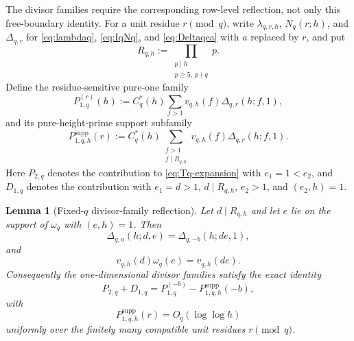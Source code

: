 \documentclass[11pt]{article}
\newtheorem{lemma}[theorem]{Lemma}
\theoremstyle{definition}
\theoremstyle{remark}
\newcommand{\1}{\mathbf 1}
\begin{document}
The divisor families require the corresponding row-level reflection, not only
this free-boundary identity.  For a unit residue $r\pmod q$, write
$\lambda_{q,r,h}$, $N_q(r;h)$, and $\Delta_{q,r}$ for
\eqref{eq:lambdaq}, \eqref{eq:IqNq}, and \eqref{eq:Deltaqea} with
$a$ replaced by $r$, and put
\[
R_{q,h}:=\prod_{\substack{p\mid h\\p\ge5,\ p\nmid q}}p.
\]
Define the residue-sensitive pure-one family
\begin{equation}\label{eq:P1-residue-q}
P_{1,q}^{(r)}(h)
:=C_q^*(h)\sum_{f>1}v_{q,h}(f)\Delta_{q,r}(h;f,1),
\end{equation}
and its pure-height-prime support subfamily
\begin{equation}\label{eq:P1-support-q}
P_{1,q,h}^{\mathrm{supp}}(r)
:=C_q^*(h)
\sum_{\substack{f>1\\f\mid R_{q,h}}}
v_{q,h}(f)\Delta_{q,r}(h;f,1).
\end{equation}
Here $P_{2,q}$ denotes the contribution to \eqref{eq:Tq-expansion} with
$e_1=1<e_2$, and $D_{1,q}$ denotes the contribution with
$e_1=d>1$, $d\mid R_{q,h}$, $e_2>1$, and $(e_2,h)=1$.

\begin{lemma}[Fixed-$q$ divisor-family reflection]\label{lem:reflection-family-q}
Let $d\mid R_{q,h}$ and let $e$ lie on the support of $\omega_q$ with
$(e,h)=1$.  Then
\begin{equation}\label{eq:reflection-row-q}
\boxed{\Delta_{q,a}(h;d,e)=\Delta_{q,-b}(h;de,1),}
\end{equation}
and
\begin{equation}\label{eq:reflection-weight-q}
\boxed{v_{q,h}(d)\omega_q(e)=v_{q,h}(de).}
\end{equation}
Consequently the one-dimensional divisor families satisfy the exact identity
\begin{equation}\label{eq:reflection-assembly-q}
\boxed{
P_{2,q}+D_{1,q}
=P_{1,q}^{(-b)}-P_{1,q,h}^{\mathrm{supp}}(-b),
}
\end{equation}
with
\begin{equation}\label{eq:support-bound-q}
P_{1,q,h}^{\mathrm{supp}}(r)=O_q(\log\log h)
\end{equation}
uniformly over the finitely many compatible unit residues $r\pmod q$.
\end{lemma}
\end{document}
